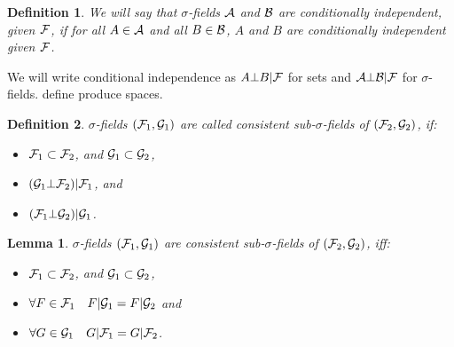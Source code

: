 \documentclass[14pt]{extarticle}
\newtheorem{lemma}{Lemma}
\newtheorem{definition}{Definition}
\newcommand{\notes}{}
\begin{document}
\begin{definition} We will say that $\sigma$-fields ${\cal A}$ and ${\cal
    B}$ are conditionally independent, given ${\cal F}$, if for all $A
  \in {\cal A}$ and all $B \in {\cal B}$, $A$ and $B$ are
  conditionally independent given ${\cal F}$.
\end{definition}

We will write conditional independence as $A \bot B|{\cal F}$
\label{def:bot} for sets and ${\cal A} \bot {\cal B} | {\cal F}$ for
$\sigma$-fields. 
{\notes define produce spaces.}

\vspace{3ex}
 



\begin{definition}  $\sigma$-fields $({\cal F}_1,{\cal
    G}_1)$ are called consistent sub-$\sigma$-fields of $({\cal
    F}_2,{\cal G}_2)$, if:
  \begin{itemize}
  \item ${\cal F}_1 \subset {\cal F}_2$, and ${\cal G}_1 \subset {\cal G}_2$,
  \item $({\cal G}_1 \bot {\cal F}_2)|{\cal F}_1$, and
  \item $({\cal F}_1 \bot {\cal G}_2)|{\cal G}_1$.
  \end{itemize}
\end{definition}

\begin{lemma}   $\sigma$-fields $({\cal F}_1,{\cal
    G}_1)$ are consistent sub-$\sigma$-fields of $({\cal F}_2,{\cal
    G}_2)$, iff:
  \begin{itemize}
  \item ${\cal F}_1 \subset {\cal F}_2$, and ${\cal G}_1 \subset {\cal G}_2$,
  \item $\forall F \in {\cal F}_1 \quad F|{\cal G}_1 = F|{\cal G}_2$
    and 
  \item $\forall G \in {\cal G}_1 \quad G|{\cal F}_1 = G|{\cal F}_2$.
  \end{itemize}
\end{lemma}
\end{document}
